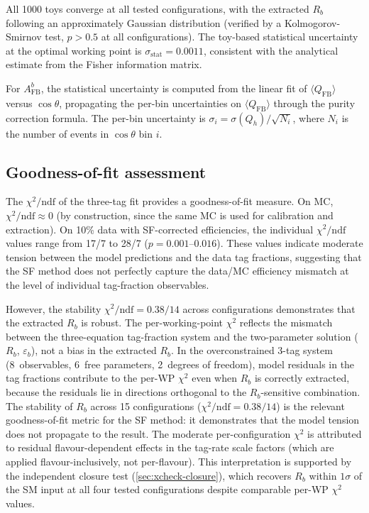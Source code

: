 \documentclass[11pt,a4paper]{article}
\begin{document}
All 1000 toys converge at all tested configurations, with the
extracted $R_b$ following an approximately Gaussian distribution
(verified by a Kolmogorov-Smirnov test, $p > 0.5$ at all
configurations).
The toy-based statistical uncertainty at the optimal working
point is $\sigma_\text{stat} = 0.0011$, consistent with the
analytical estimate from the Fisher information matrix.

For $A_\text{FB}^b$, the statistical uncertainty is computed
from the linear fit of $\langle Q_\text{FB}\rangle$ versus
$\cos\theta$, propagating the per-bin uncertainties on
$\langle Q_\text{FB}\rangle$ through the purity correction
formula.
The per-bin uncertainty is $\sigma_i = \sigma(Q_h) / \sqrt{N_i}$,
where $N_i$ is the number of events in $\cos\theta$ bin $i$.

\subsection{Goodness-of-fit assessment}
\label{sec:stat-gof}

The $\chi^2/\text{ndf}$ of the three-tag fit provides a
goodness-of-fit measure.
On MC, $\chi^2/\text{ndf} \approx 0$ (by construction, since
the same MC is used for calibration and extraction).
On 10\% data with SF-corrected efficiencies, the individual
$\chi^2/\text{ndf}$ values range from 17/7 to 28/7
($p = 0.001$--$0.016$).
These values indicate moderate tension between the model
predictions and the data tag fractions, suggesting that the
SF method does not perfectly capture the data/MC efficiency
mismatch at the level of individual tag-fraction observables.

However, the stability $\chi^2/\text{ndf} = 0.38/14$ across
configurations demonstrates that the extracted $R_b$ is
robust.
The per-working-point $\chi^2$ reflects the mismatch between the
three-equation tag-fraction system and the two-parameter solution
($R_b$, $\varepsilon_b$), not a bias in the extracted $R_b$.
In the overconstrained 3-tag system (8~observables, 6~free
parameters, 2~degrees of freedom), model residuals in the
tag fractions contribute to the per-WP $\chi^2$ even when $R_b$
is correctly extracted, because the residuals lie in directions
orthogonal to the $R_b$-sensitive combination.
The stability of $R_b$ across 15 configurations
($\chi^2/\text{ndf} = 0.38/14$) is the relevant goodness-of-fit
metric for the SF method: it demonstrates that the model tension
does not propagate to the result.
The moderate per-configuration $\chi^2$ is attributed to
residual flavour-dependent effects in the tag-rate scale
factors (which are applied flavour-inclusively, not per-flavour).
This interpretation is supported by the independent closure test
(\cref{sec:xcheck-closure}), which recovers $R_b$ within
$1\sigma$ of the SM input at all four tested configurations
despite comparable per-WP $\chi^2$ values.
\end{document}
